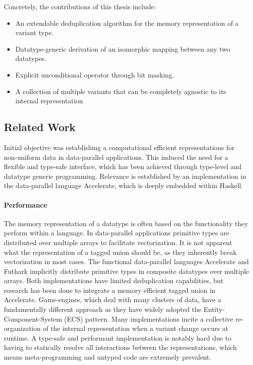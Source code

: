 \documentclass{article}
\begin{document}
\noindent
Concretely, the contributions of this thesis include: 

\begin{itemize}
    \item An extendable deduplication algorithm for the memory representation of a variant type.
    \item Datatype-generic derivation of an isomorphic mapping between any two datatypes.
    \item Explicit unconditional operator through bit masking.
    \item A collection of multiple variants that can be completely agnostic to its internal representation
\end{itemize}

\newpage

\subsection{Related Work}

Initial objective was establishing a computational efficient representations for non-uniform data in data-parallel applications.
This induced the need for a flexible and type-safe interface, which has been achieved through type-level and datatype generic programming.
Relevance is established by an implementation in the data-parallel language Accelerate, which is deeply embedded within Haskell.

\paragraph{Performance}

The memory representation of a datatype is often based on the functionality they perform within a language.
In data-parallel applications primitive types are distributed over multiple arrays to facilitate vectorization.
It is not apparent what the representation of a tagged union should be, as they inherently break vectorization in most cases. 
The functional data-parallel languages Accelerate\cite{accelerate-sum-types} and Futhark\cite{futhark-sum-types} implicitly distribute primitive types in composite datatypes over multiple arrays.
Both implementations have limited deduplication capabilities, but research has been done to integrate a memory efficient tagged union in Accelerate\cite{accelerate-sum-types}.
Game-engines, which deal with many clusters of data, have a fundamentally different approach as they have widely adopted the Entity-Component-System (ECS) pattern. 
Many implementations incite a collective re-organization of the internal representation when a variant change occurs at runtime.
A type-safe and performant implementation is notably hard due to having to statically resolve all interactions between the representations, which means meta-programming and untyped code are extremely prevalent. 
\end{document}
